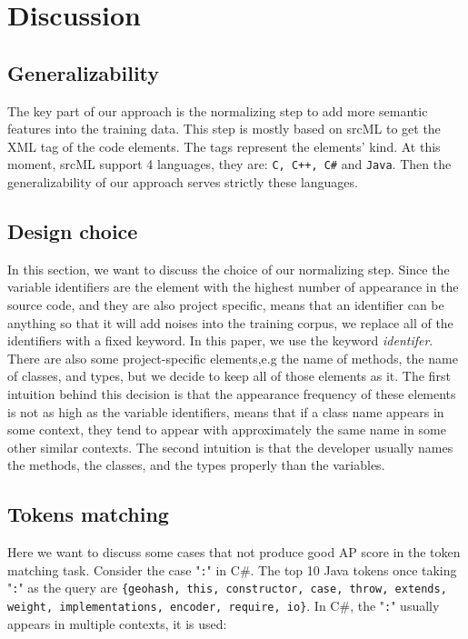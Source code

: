 \section{Discussion}
\subsection{Generalizability}

The key part of our approach is the normalizing step to add more semantic features into the training data. This step is mostly based on srcML \cite{collard2011lightweight} to get the XML tag of the code elements. The tags represent the elements' kind. At this moment, srcML support 4 languages, they are: \texttt{C, C++, C\#} and \texttt{Java}. Then the generalizability of our approach serves strictly these languages.

\subsection{Design choice}
In this section, we want to discuss the choice of our normalizing step.
Since the variable identifiers are the element with the highest number of appearance in the source code, and they are also project specific, means that an identifier can be anything so that it will add noises into the training corpus, we replace all of the identifiers with a fixed keyword. In this paper, we use the keyword \textit{identifer}. There are also some project-specific elements,e.g the name of methods, the name of classes, and types, but we decide to keep all of those elements as it. The first intuition behind this decision is that the appearance frequency of these elements is not as high as the variable identifiers, means that if a class name appears in some context, they tend to appear with approximately the same name in some other similar contexts. The second intuition is that the developer usually names the methods, the classes, and the types properly than the variables.

\subsection{Tokens matching}
Here we want to discuss some cases that not produce good AP score in the token matching task. Consider the case "\texttt{:}" in C\#. The top 10 Java tokens once taking "\texttt{:}" as the query are \texttt{\{geohash, this, constructor, case, throw, extends, weight, implementations, encoder, require, io\}}. In C\#, the "\texttt{:}" usually appears in multiple contexts, it is used:

